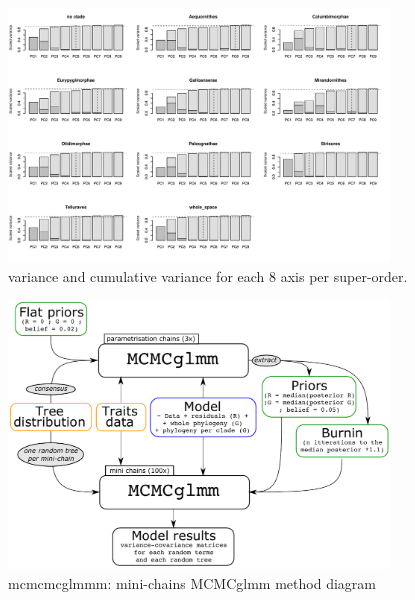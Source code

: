 \documentclass[sn-mathphys]{sn-jnl}%
\theoremstyle{thmstyleone}%
\theoremstyle{thmstyletwo}%
\theoremstyle{thmstylethree}%
\begin{document}
\begin{figure}[!htbp]
\centering
   \includegraphics[width=0.9\textwidth]{Figures/axis_selection.pdf}
\caption{variance and cumulative variance for each 8 axis per super-order.}
\label{Fig:axes_variance}
\end{figure}


\begin{figure}[!htbp]
\centering
   \includegraphics[width=0.9\textwidth]{Figures/mini-chains_diagram.pdf}
\caption{mcmcmcglmmm: mini-chains MCMCglmm method diagram}
\label{Fig:fig_mcmcmcglmm}
\end{figure}
\end{document}

